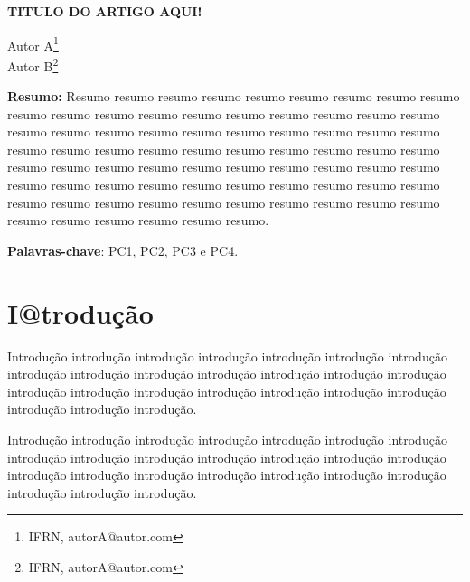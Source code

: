 \documentclass[article,12pt,oneside,a4paper,english,brazil,sumario=tradicional]{abntex2}
\begin{document}
\frenchspacing %

\begin{center}
	\uppercase{\bfseries{Titulo do Artigo Aqui!}}
	\vspace{12pt}
\end{center}

\begin{flushright}
	Autor A\footnote{IFRN, autorA@autor.com}
	\\
	Autor B\footnote{IFRN, autorA@autor.com}
	\vspace{12pt}
\end{flushright}

\begin{footnotesize}
\SingleSpacing
\noindent
\small{\textbf{Resumo:}}
\noindent
\small
Resumo resumo resumo resumo resumo resumo resumo resumo resumo resumo resumo resumo resumo resumo resumo resumo resumo resumo resumo resumo resumo resumo resumo resumo resumo resumo resumo resumo resumo resumo resumo resumo resumo resumo resumo resumo resumo resumo resumo resumo resumo resumo resumo resumo resumo resumo resumo resumo resumo resumo resumo resumo resumo resumo resumo resumo resumo resumo resumo resumo resumo resumo resumo resumo resumo resumo resumo resumo resumo resumo resumo resumo resumo resumo resumo.

\noindent
\textbf{Palavras-chave}: PC1, PC2, PC3 e PC4.
\end{footnotesize}

\textual
\pagestyle{simple}


\section{I@trodu\c c\~ao}
\label{secIntroducao}
\normalsize
Introdu\c c\~ao introdu\c c\~ao introdu\c c\~ao introdu\c c\~ao introdu\c c\~ao introdu\c c\~ao introdu\c c\~ao introdu\c c\~ao introdu\c c\~ao introdu\c c\~ao introdu\c c\~ao introdu\c c\~ao introdu\c c\~ao introdu\c c\~ao introdu\c c\~ao introdu\c c\~ao introdu\c c\~ao introdu\c c\~ao introdu\c c\~ao introdu\c c\~ao introdu\c c\~ao introdu\c c\~ao introdu\c c\~ao introdu\c c\~ao.

Introdu\c c\~ao introdu\c c\~ao introdu\c c\~ao introdu\c c\~ao introdu\c c\~ao introdu\c c\~ao introdu\c c\~ao introdu\c c\~ao introdu\c c\~ao introdu\c c\~ao introdu\c c\~ao introdu\c c\~ao introdu\c c\~ao introdu\c c\~ao introdu\c c\~ao introdu\c c\~ao introdu\c c\~ao introdu\c c\~ao introdu\c c\~ao introdu\c c\~ao introdu\c c\~ao introdu\c c\~ao introdu\c c\~ao introdu\c c\~ao.
\end{document}
